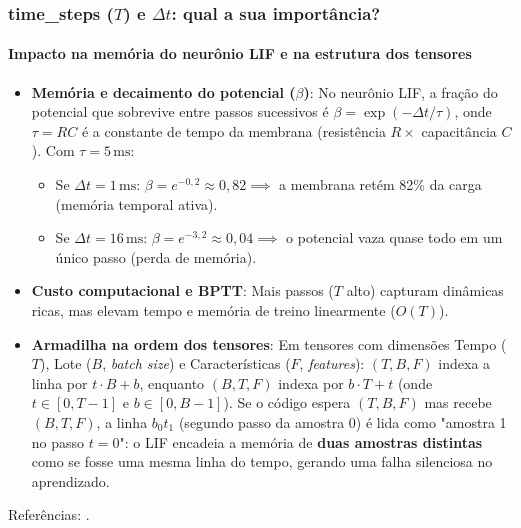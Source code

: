\begin{frame}[shrink]
	\frametitle{time\_steps ($T$) e $\Delta t$: qual a sua importância?}
	\framesubtitle{Impacto na memória do neurônio LIF e na estrutura dos tensores}
	\small
	\begin{itemize}
		\setlength{\itemsep}{2pt}
		\item \textbf{Memória e decaimento do potencial ($\beta$)}:
		No neurônio LIF, a fração do potencial que sobrevive entre passos sucessivos é $\beta = \exp(-\Delta t / \tau)$, onde $\tau = RC$ é a constante de tempo da membrana (resistência $R \times$ capacitância $C$). Com $\tau = 5\,\text{ms}$:
		\begin{itemize}
			\item Se $\Delta t = 1\,\text{ms}$: $\beta = e^{-0{,}2} \approx 0{,}82 \implies$ a membrana retém 82\% da carga (memória temporal ativa).
			\item Se $\Delta t = 16\,\text{ms}$: $\beta = e^{-3{,}2} \approx 0{,}04 \implies$ o potencial vaza quase todo em um único passo (perda de memória).
		\end{itemize}
		\item \textbf{Custo computacional e BPTT}: Mais passos ($T$ alto) capturam dinâmicas ricas, mas elevam tempo e memória de treino linearmente ($O(T)$).
		\item \textbf{Armadilha na ordem dos tensores}: Em tensores com dimensões Tempo ($T$), Lote ($B$, \textit{batch size}) e Características ($F$, \textit{features}):
		$(T,B,F)$ indexa a linha por $t \cdot B + b$, enquanto $(B,T,F)$ indexa por $b \cdot T + t$ (onde $t \in [0, T-1]$ e $b \in [0, B-1]$).
		Se o código espera $(T,B,F)$ mas recebe $(B,T,F)$, a linha $b_0t_1$ (segundo passo da amostra 0) é lida como "amostra 1 no passo $t{=}0$": o LIF encadeia a memória de \textbf{duas amostras distintas} como se fosse uma mesma linha do tempo, gerando uma falha silenciosa no aprendizado.
	\end{itemize}
	\par\vfill{\tiny Referências: \cite{gerstner2014neuronal, eshraghian2023training}.}
\end{frame}
